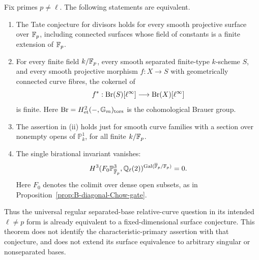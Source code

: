 \begin{theorem}
\label{thm:B-relative-surface-gate}
Fix primes \(p\ne\ell\).  The following statements are equivalent.
\begin{enumerate}[label=(\roman*)]
\item The Tate conjecture for divisors holds for every smooth
projective surface over \(\mathbb F_p\), including connected surfaces
whose field of constants is a finite extension of \(\mathbb F_p\).
\item For every finite field \(k/\mathbb F_p\), every smooth separated
finite-type \(k\)-scheme \(S\), and every smooth projective
morphism \(f:X\to S\) with geometrically connected curve fibres,
the cokernel of
\[
 f^*:\operatorname{Br}(S)[\ell^\infty]\longrightarrow\operatorname{Br}(X)[\ell^\infty]
\]
is finite.  Here \(\operatorname{Br}=H^2_{\mathrm{et}}(-,{\mathbb G_m})_{\mathrm{tors}}\)
is the cohomological Brauer group.
\item The assertion in (ii) holds just for smooth curve families
with a section over nonempty opens of \(\mathbb P^1_k\), for
all finite \(k/\mathbb F_p\).
\item The single birational invariant vanishes:
\[
 H^3(F_0\mathbb P^3_{\overline{\mathbb F}_p},\mathbb Q_\ell(2))^
 {\operatorname{Gal}(\overline{\mathbb F}_p/\mathbb F_p)}=0.
\]
Here \(F_0\) denotes the colimit over dense open subsets, as
in Proposition~\ref{prop:B-diagonal-Chow-gate}.
\end{enumerate}
Thus the universal regular separated-base relative-curve question
in its intended \(\ell\ne p\) form is already equivalent to a
fixed-dimensional surface conjecture.  This theorem does not
identify the characteristic-primary assertion with that conjecture,
and does not extend its surface equivalence to arbitrary singular
or nonseparated bases.
\end{theorem}

